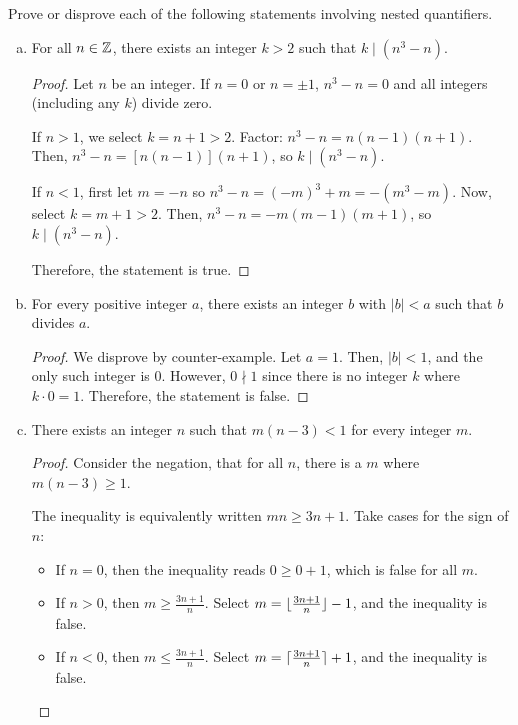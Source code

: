 \question Prove or disprove each of the following statements involving nested quantifiers.
\begin{enumerate}[(a)]
  \item For all $n \in\mathbb{Z}$, there exists an integer $k > 2$ such that $k \mid (n^3 - n)$.
        \begin{proof}
          Let $n$ be an integer. If $n=0$ or $n=\pm1$, $n^3-n=0$ and all integers (including any $k$) divide zero.

          If $n > 1$, we select $k=n+1 > 2$.
          Factor: $n^3-n = n(n-1)(n+1)$.
          Then, $n^3 - n = [n(n-1)](n+1)$, so $k \mid (n^3-n)$.

          If $n < 1$, first let $m = -n$ so $n^3-n = (-m)^3+m = -(m^3-m)$.
          Now, select $k = m+1 > 2$.
          Then, $n^3 - n = -m(m-1)(m+1)$, so $k \mid (n^3-n)$.

          Therefore, the statement is true.
        \end{proof}

  \item For every positive integer $a$, there exists an integer $b$ with $|b| < a$ such that $b$ divides $a$.
        \begin{proof}
          We disprove by counter-example.
          Let $a = 1$.
          Then, $|b| < 1$, and the only such integer is 0.
          However, $0 \nmid 1$ since there is no integer $k$ where $k \cdot 0 = 1$.
          Therefore, the statement is false.
        \end{proof}

  \item There exists an integer $n$ such that $m(n - 3) < 1$ for every integer $m$.
        \begin{proof}
          Consider the negation, that for all $n$, there is a $m$ where $m(n - 3) \geq 1$.

          The inequality is equivalently written $mn \geq 3n + 1$.
          Take cases for the sign of $n$:
          \begin{itemize}
            \item If $n = 0$, then the inequality reads $0 \geq 0 + 1$, which is false for all $m$.
            \item If $n > 0$, then $m \geq \frac{3n+1}{n}$.
                  Select $m = \lfloor\frac{3n+1}{n}\rfloor - 1$, and the inequality is false.
            \item If $n < 0$, then $m \leq \frac{3n+1}{n}$.
                  Select $m = \lceil\frac{3n+1}{n}\rceil + 1$, and the inequality is false.
          \end{itemize}


\end{proof}
\end{enumerate}
